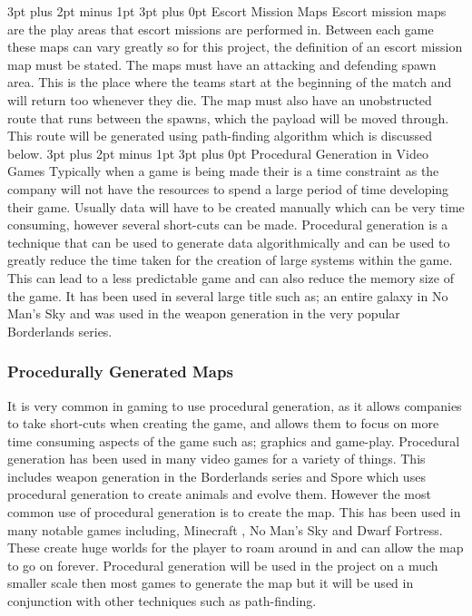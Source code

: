 \documentclass[12pt,a4paper,oneside]{book}
\makeatletter
\renewcommand\subsection{\@startsection {subsection}{1}{2mm} %
                               {3pt plus 2pt minus 1pt} %
                               {3pt plus 0pt} %
                               {\normalfont\bfseries}}
\makeatother
\begin{document}
\subsection{Escort Mission Maps}
Escort mission maps are the play areas that escort missions are performed in. Between each game these maps can vary greatly so for this project, the definition of an escort mission map must be stated. The maps must have an attacking and defending spawn area. This is the place where the teams start at the beginning of the match and will return too whenever they die. The map must also have an unobstructed route that runs between the spawns, which the payload will be moved through. This route will be generated using path-finding algorithm which is discussed below. 
\subsection{Procedural Generation in Video Games}
Typically when a game is being made their is a time constraint as the company will not have the resources to spend a large period of time developing their game. Usually data will have to be created manually which can be very time consuming, however several short-cuts can be made.
\vspace{5mm} 
\newline
Procedural generation is a technique that can be used  to generate data algorithmically and can be used to greatly reduce the time taken for the creation of large systems within the game. This can lead to a less predictable game and can also reduce the memory size of the game. It has been used in several large title such as; an entire galaxy in No Man's Sky and was used in the weapon generation in the very popular Borderlands series.  
\subsubsection{Procedurally Generated Maps}
It is very common in gaming to use procedural generation, as it allows companies to take short-cuts when creating the game, and allows them to focus on more time consuming aspects of the game such as; graphics and game-play. Procedural generation has been used in many video games for a variety of things. This includes weapon generation in the Borderlands series and Spore which uses procedural generation to create animals and evolve them. However the most common use of procedural generation is to create the map. This has been used in many notable games including, Minecraft , No Man’s Sky and Dwarf Fortress. These create huge worlds for the player to roam around in and can allow the map to go on forever. Procedural generation will be used in the project on a much smaller scale then most games to generate the map but it will be used in conjunction with other techniques such as path-finding.  
\end{document}
